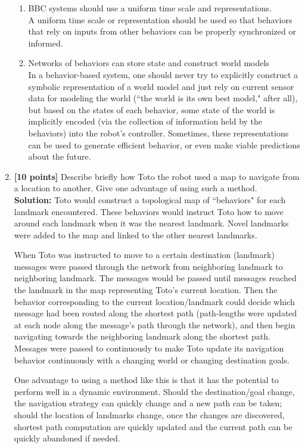 \documentclass{article}
\begin{document}
\begin{enumerate}
\begin{enumerate}
        \item{BBC systems should use a uniform time scale and representations.}\\
        A uniform time scale or representation should be used so that behaviors that rely on inputs from other behaviors can be properly synchronized or informed.
        \newline

        \item{Networks of behaviors can store state and construct world models}\\
        In a behavior-based system, one should never try to explicitly construct a symbolic representation of a world model and just rely on current sensor data for modeling the world (``the world is its own best model," after all), but based on the states of each behavior, some state of the world is implicitly encoded (via the collection of information held by the behaviors) into the robot's controller. Sometimes, these representations can be used to generate efficient behavior, or even make viable predictions about the future. 
        \newline
    \end{enumerate}
\newline

\item \textbf{[10 points]} Describe briefly how Toto the robot used a map to navigate from a location to another. Give one advantage of using such a method.\\

\textbf{Solution:} Toto would construct a topological map of ``behaviors" for each landmark encountered. These behaviors would instruct Toto how to move around each landmark when it was the nearest landmark. Novel landmarks were added to the map and linked to the other nearest landmarks.

When Toto was instructed to move to a certain destination (landmark) messages were passed through the network from neighboring landmark to neighboring landmark. The messages would be passed until messages reached the landmark in the map representing Toto's current location. Then the behavior corresponding to the current location/landmark could decide which message had been routed along the shortest path (path-lengths were updated at each node along the message's path through the network), and then begin navigating towards the neighboring landmark along the shortest path. Messages were passed to continuously to make Toto update its navigation behavior continuously with a changing world or changing destination goals.

One advantage to using a method like this is that it has the potential to perform well in a dynamic environment. Should the destination/goal change, the navigation strategy can quickly change and a new path can be taken; should the location of landmarks change, once the changes are discovered, shortest path computation are quickly updated and the current path can be quickly abandoned if needed.
\newline
   
\end{enumerate}
\end{document}
